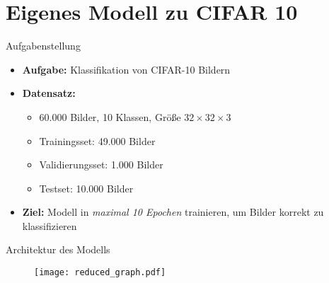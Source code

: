 \section{Eigenes Modell zu CIFAR 10}


\begin{frame}{Aufgabenstellung}
    \begin{itemize}[left=1em] %
        \item \textbf{Aufgabe:} Klassifikation von CIFAR-10 Bildern
        \item \textbf{Datensatz:}
            \begin{itemize}[topsep=1pt, itemsep=1pt] %
                \item 60.000 Bilder, 10 Klassen, Größe $32\times32\times3$
                \item Trainingsset: 49.000 Bilder
                \item Validierungsset: 1.000 Bilder
                \item Testset: 10.000 Bilder
            \end{itemize}
        \item \textbf{Ziel:} Modell in \emph{maximal 10 Epochen} trainieren, um Bilder korrekt zu klassifizieren
    \end{itemize}
\end{frame}




\begin{frame}{Architektur des Modells}
    \begin{figure}
        \centering
        \texttt{[image: reduced\_graph.pdf]}
    \end{figure}

\end{frame}


